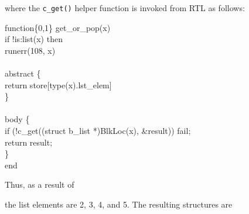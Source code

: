 \noindent where the \texttt{c\_get()} helper function is invoked from RTL as follows:

\begin{iconcode}
function\{0,1\} get\_or\_pop(x)\\
\>if !is:list(x) then\\
\>\>runerr(108, x)\\
\\
\>abstract \{\\
\>\>return store[type(x).lst\_elem]\\
\>\>\}\\
\\
\>body \{\\
\>\>if (!c\_get((struct b\_list *)BlkLoc(x), \&result)) fail;\\
\>\>return result;\\
\>\>\}\\
end
\end{iconcode}

Thus, as a result of


\noindent
the list elements are 2, 3, 4, and 5. The resulting structures are


